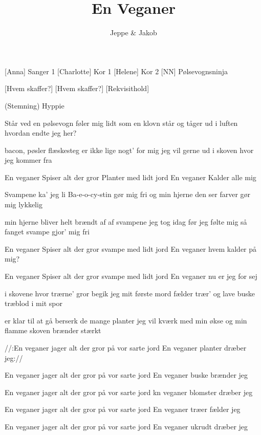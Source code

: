 \documentclass[a4paper,11pt]{article}
\title{En Veganer}
\author{Jeppe \& Jakob}
\begin{document}
\maketitle

\begin{roles}
    [Anna] Sanger 1
    [Charlotte] Kor 1
    [Helene] Kor 2
	[NN] Pølsevognsninja
\end{roles}

\begin{props}
    [Hvem skaffer?] 
    [Hvem skaffer?] 
    [Rekvisithold] 
\end{props}

\begin{song}
  \scene (Stemning) Hyppie

Står ved en pølsevogn
føler mig lidt som en klovn
står og tåger ud i luften
hvordan endte jeg her?

bacon, pøsler flæskesteg
er ikke lige nogt’ for mig
jeg vil gerne ud i skoven
hvor jeg kommer fra

En veganer
Spiser alt der gror
Planter med lidt jord
En veganer
Kalder alle mig

Svampene ka’ jeg li
Ba-e-o-cy-stin gør mig fri
og min hjerne den ser farver
gør mig lykkelig

min hjerne bliver helt brændt af
af svampene jeg tog idag
før jeg følte mig så fanget
svampe gjor’ mig fri

En veganer
Spiser alt der gror
svampe med lidt jord
En veganer
hvem kalder på mig?

En veganer
Spiser alt der gror
svampe med lidt jord
En veganer
nu er jeg for sej

i skovene hvor trærne’ gror
begik jeg mit første mord
fælder trær’ og lave buske
træblod i mit spor

er klar til at gå berserk
de mange planter jeg vil kværk
med min økse og min flamme
skoven brænder stærkt 

//:En veganer
jager alt der gror
på vor sarte jord
En veganer
planter dræber jeg://

En veganer
jager alt der gror
på vor sarte jord
En veganer
buske brænder jeg

En veganer
jager alt der gror
på vor sarte jord
kn veganer
blomster dræber jeg

En veganer
jager alt der gror
på vor sarte jord
En veganer
træer fælder jeg

En veganer
jager alt der gror
på vor sarte jord
En veganer
ukrudt dræber jeg
  


\end{song}
\end{document}
